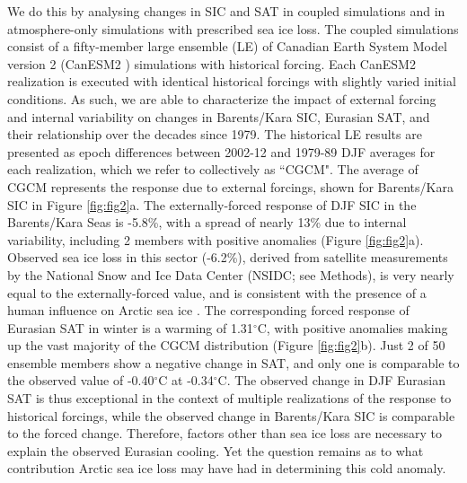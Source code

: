 \documentclass{nature}
\begin{document}
We do this by analysing changes in SIC and SAT in coupled simulations and in atmosphere-only simulations with prescribed sea ice loss. The coupled simulations consist of a fifty-member large ensemble (LE) of Canadian Earth System Model version 2 (CanESM2 \cite{arora11}) simulations with historical forcing. Each CanESM2 realization is executed with identical historical forcings with slightly varied initial conditions. As such, we are able to characterize the impact of external forcing and internal variability on changes in Barents/Kara SIC, Eurasian SAT, and their relationship over the decades since 1979. The historical LE results are presented as epoch differences between 2002-12 and 1979-89 DJF averages for each realization, which we refer to collectively as ``CGCM". The average of CGCM represents the response due to external forcings, shown for Barents/Kara SIC in Figure \ref{fig:fig2}a. The externally-forced response of DJF SIC in the Barents/Kara Seas is -5.8\%, with a spread of nearly 13\% due to internal variability, including 2 members with positive anomalies (Figure \ref{fig:fig2}a). Observed sea ice loss in this sector (-6.2\%), derived from satellite measurements by the National Snow and Ice Data Center (NSIDC; see Methods), is very nearly equal to the externally-forced value, and is consistent with the presence of a human influence on Arctic sea ice \cite{min08}. The corresponding forced response of Eurasian SAT in winter is a warming of 1.31$^\circ$C, with positive anomalies making up the vast majority of the CGCM distribution (Figure \ref{fig:fig2}b). Just 2 of 50 ensemble members show a negative change in SAT, and only one is comparable to the observed value of -0.40$^\circ$C at -0.34$^\circ$C. The observed change in DJF Eurasian SAT is thus exceptional in the context of multiple realizations of the response to historical forcings, while the observed change in Barents/Kara SIC is comparable to the forced change. Therefore, factors other than sea ice loss are necessary to explain the observed Eurasian cooling. Yet the question remains as to what contribution Arctic sea ice loss may have had in determining this cold anomaly. 

\end{document}
